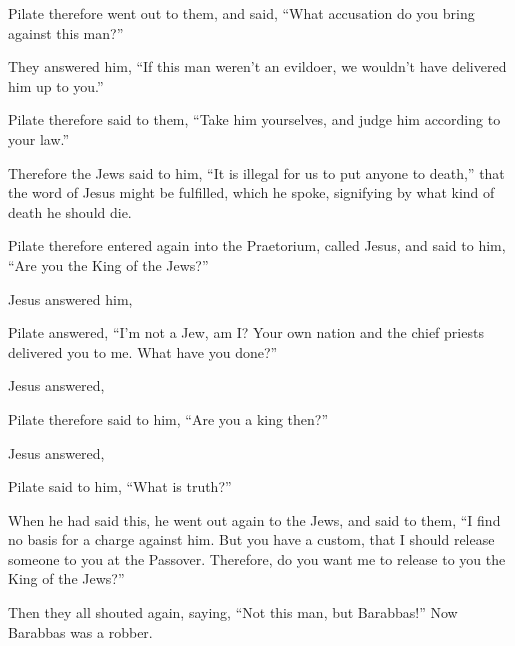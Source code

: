 {Pilate therefore went out to them, and said, “What accusation do you bring against this man?”
\par }{\PP {}They answered him, “If this man weren’t an evildoer, we wouldn’t have delivered him up to you.”
\par }{\PP {}Pilate therefore said to them, “Take him yourselves, and judge him according to your law.”
\par }{\PP Therefore the Jews said to him, “It is illegal for us to put anyone to death,”
that the word of Jesus might be fulfilled, which he spoke, signifying by what kind of death he should die.
\par }{\PP {}Pilate therefore entered again into the Praetorium, called Jesus, and said to him, “Are you the King of the Jews?”
\par }{\PP {}Jesus answered him,
{}
\par }{\PP {}Pilate answered, “I’m not a Jew, am I? Your own nation and the chief priests delivered you to me. What have you done?”
\par }{\PP {}Jesus answered,
{}
\par }{\PP {}Pilate therefore said to him, “Are you a king then?”
\par }{\PP Jesus answered,
{}
\par }{\PP {}Pilate said to him, “What is truth?”
\par }{\PP When he had said this, he went out again to the Jews, and said to them, “I find no basis for a charge against him.
But you have a custom, that I should release someone to you at the Passover. Therefore, do you want me to release to you the King of the Jews?”
\par }{\PP {}Then they all shouted again, saying, “Not this man, but Barabbas!” Now Barabbas was a robber.

}
